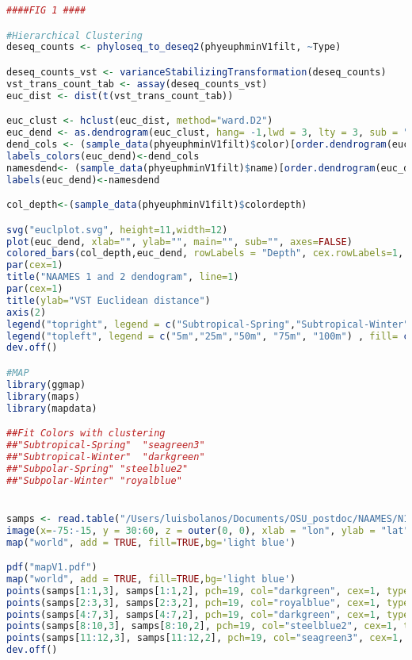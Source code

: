 \documentclass{article}
\begin{document}
\begin{lstlisting}[language=R,caption={N1N2figscripts}]
####FIG 1 ####

#Hierarchical Clustering
deseq_counts <- phyloseq_to_deseq2(phyeuphminV1filt, ~Type)

deseq_counts_vst <- varianceStabilizingTransformation(deseq_counts)
vst_trans_count_tab <- assay(deseq_counts_vst)
euc_dist <- dist(t(vst_trans_count_tab))

euc_clust <- hclust(euc_dist, method="ward.D2")
euc_dend <- as.dendrogram(euc_clust, hang= -1,lwd = 3, lty = 3, sub = "")
dend_cols <- (sample_data(phyeuphminV1filt)$color)[order.dendrogram(euc_dend)]
labels_colors(euc_dend)<-dend_cols
namesdend<- (sample_data(phyeuphminV1filt)$name)[order.dendrogram(euc_dend)]
labels(euc_dend)<-namesdend

col_depth<-(sample_data(phyeuphminV1filt)$colordepth)

svg("euclplot.svg", height=11,width=12)
plot(euc_dend, xlab="", ylab="", main="", sub="", axes=FALSE)
colored_bars(col_depth,euc_dend, rowLabels = "Depth", cex.rowLabels=1, y_shift = -52)
par(cex=1)
title("NAAMES 1 and 2 dendogram", line=1)
par(cex=1)
title(ylab="VST Euclidean distance")
axis(2)
legend("topright", legend = c("Subtropical-Spring","Subtropical-Winter","Subpolar-Spring","Subpolar-Winter") , fill= c("seagreen3","darkgreen", "steelblue2", "royalblue"), bty="n", cex=1.00, title="Region-Season")
legend("topleft", legend = c("5m","25m","50m", "75m", "100m") , fill= c("cadetblue1", "cadetblue2", "cadetblue3","aquamarine3", "cadetblue4"), bty="n", cex=.8)
dev.off()

#MAP
library(ggmap)
library(maps)
library(mapdata)

##Fit Colors with clustering 
##"Subtropical-Spring"	"seagreen3"
##"Subtropical-Winter"	"darkgreen"
##"Subpolar-Spring"	"steelblue2"
##"Subpolar-Winter"	"royalblue"


samps <- read.table("/Users/luisbolanos/Documents/OSU_postdoc/NAAMES/N1N2/Metadata/CoordsSt.txt", header=T,sep="\t")
image(x=-75:-15, y = 30:60, z = outer(0, 0), xlab = "lon", ylab = "lat")
map("world", add = TRUE, fill=TRUE,bg='light blue')

pdf("mapV1.pdf")
map("world", add = TRUE, fill=TRUE,bg='light blue')
points(samps[1:1,3], samps[1:1,2], pch=19, col="darkgreen", cex=1, type="o")
points(samps[2:3,3], samps[2:3,2], pch=19, col="royalblue", cex=1, type="o")
points(samps[4:7,3], samps[4:7,2], pch=19, col="darkgreen", cex=1, type="o")
points(samps[8:10,3], samps[8:10,2], pch=19, col="steelblue2", cex=1, type="o")
points(samps[11:12,3], samps[11:12,2], pch=19, col="seagreen3", cex=1, type="o")
dev.off()


\end{lstlisting}
\end{document}
